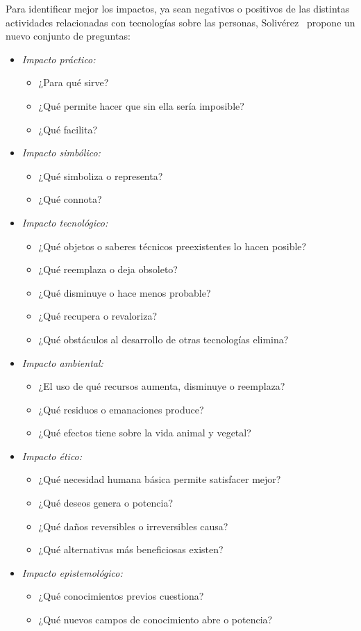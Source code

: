 Para identificar mejor los impactos, ya sean negativos o positivos de las distintas actividades relacionadas con tecnologías sobre las personas,
Solivérez~\cite{soliverez} propone un nuevo conjunto de preguntas:
\begin{itemize}
	\item \emph{Impacto práctico:}
	\begin{itemize}
		\item ¿Para qué sirve?
		\item ¿Qué permite hacer que sin ella sería imposible?
		\item ¿Qué facilita?
	\end{itemize}
	\item \emph{Impacto simbólico:}
	\begin{itemize}
		\item ¿Qué simboliza o representa?
		\item ¿Qué connota?
	\end{itemize}
	\item \emph{Impacto tecnológico:}
	\begin{itemize}
		\item ¿Qué objetos o saberes técnicos preexistentes lo hacen posible?
		\item ¿Qué reemplaza o deja obsoleto?
		\item ¿Qué disminuye o hace menos probable?
		\item ¿Qué recupera o revaloriza?
		\item ¿Qué obstáculos al desarrollo de otras tecnologías elimina?
	\end{itemize}
	\item \emph{Impacto ambiental:}
	\begin{itemize}
		\item ¿El uso de qué recursos aumenta, disminuye o reemplaza?
		\item ¿Qué residuos o emanaciones produce?
		\item ¿Qué efectos tiene sobre la vida animal y vegetal?
	\end{itemize}
	\item \emph{Impacto ético:}
	\begin{itemize}
		\item ¿Qué necesidad humana básica permite satisfacer mejor?
		\item ¿Qué deseos genera o potencia?
		\item ¿Qué daños reversibles o irreversibles causa?
		\item ¿Qué alternativas más beneficiosas existen?
	\end{itemize}
	\item \emph{Impacto epistemológico:}
	\begin{itemize}
		\item ¿Qué conocimientos previos cuestiona?
		\item ¿Qué nuevos campos de conocimiento abre o potencia?
	\end{itemize}
\end{itemize}

